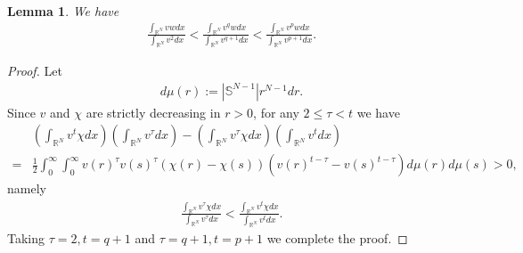 \documentclass{article}
\newtheorem{lemma}[theorem]{Lemma}
\theoremstyle{definition} \theoremstyle{remark}
\numberwithin{equation}{section}
\newcommand{\R}{\mathbb{R}}
\begin{document}
	\begin{lemma}
		We have
		\begin{align} \label{momentcompare}
			\frac{\int_{\R^N}vwdx}{\int_{\R^N}v^2dx} < \frac{\int_{\R^N}v^qwdx}{\int_{\R^N}v^{q+1}dx} < \frac{\int_{\R^N}v^pwdx}{\int_{\R^N}v^{p+1}dx}.
		\end{align}
	\end{lemma}

	\begin{proof}
		Let
		\begin{align*}
			d\mu(r) := |\mathbb{S}^{N-1}|r^{N-1}dr.
		\end{align*}
		Since $v$ and $\chi$ are strictly decreasing in $r > 0$, for any $2 \le \tau < t$ we have
		\begin{align*}
			& \left(\int_{\R^N}v^t\chi dx\right)\left(\int_{\R^N}v^\tau dx\right) - \left(\int_{\R^N}v^\tau\chi dx\right)\left(\int_{\R^N}v^tdx\right) \\
			= & \frac{1}{2}\int_0^\infty\int_0^\infty v(r)^\tau v(s)^\tau\left(\chi(r) - \chi(s)\right) \left(v(r)^{t-\tau} - v(s)^{t-\tau}\right)d\mu(r)d\mu(s) > 0,
		\end{align*}
		namely
		\begin{align*}
			\frac{\int_{\R^N}v^\tau \chi dx}{\int_{\R^N}v^\tau dx} < \frac{\int_{\R^N}v^t\chi dx}{\int_{\R^N}v^t dx}.
		\end{align*}
		Taking $\tau = 2, t = q+1$ and $\tau = q+1, t = p+1$ we complete the proof.
	\end{proof}
\end{document}
